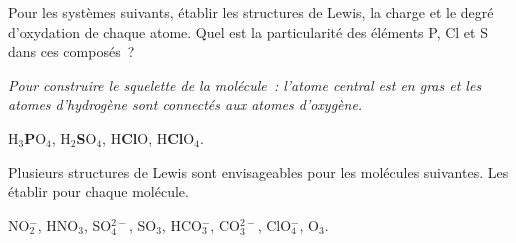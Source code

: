 
Pour les syst\`emes suivants, \'etablir les structures de Lewis, la charge et le degr\'e
d'oxydation de chaque atome. Quel est la particularit\'e des \'el\'ements P, Cl et S dans ces compos\'es~?

{\small \textit{Pour construire le squelette de la mol\'ecule~: l'atome central est en gras et les atomes d'hydrog\`ene 
sont connect\'es aux atomes d'oxyg\`ene.}}

\vspace{0.5cm}

\centerline{H$_3$\textbf{P}O$_4$, H$_2$\textbf{S}O$_4$, H\textbf{Cl}O, H\textbf{Cl}O$_4$.}


Plusieurs structures de Lewis sont envisageables pour les mol\'ecules suivantes. 
Les \'etablir pour chaque mol\'ecule. 

\vspace{0.5cm}

\centerline{NO$_2^-$, HNO$_3$, SO$_4^{2-}$, SO$_3$, HCO$_3^-$, CO$_3^{2-}$, ClO$_4^-$, O$_3$.}

